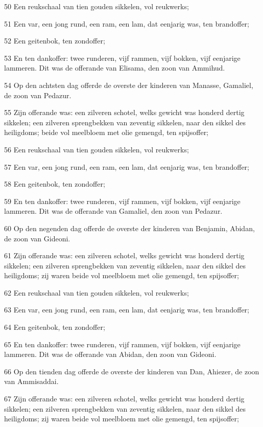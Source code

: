 \par 50 Een reukschaal van tien gouden sikkelen, vol reukwerks;
\par 51 Een var, een jong rund, een ram, een lam, dat eenjarig was, ten brandoffer;
\par 52 Een geitenbok, ten zondoffer;
\par 53 En ten dankoffer: twee runderen, vijf rammen, vijf bokken, vijf eenjarige lammeren. Dit was de offerande van Elisama, den zoon van Ammihud.
\par 54 Op den achtsten dag offerde de overste der kinderen van Manasse, Gamaliel, de zoon van Pedazur.
\par 55 Zijn offerande was: een zilveren schotel, welks gewicht was honderd dertig sikkelen; een zilveren sprengbekken van zeventig sikkelen, naar den sikkel des heiligdoms; beide vol meelbloem met olie gemengd, ten spijsoffer;
\par 56 Een reukschaal van tien gouden sikkelen, vol reukwerks;
\par 57 Een var, een jong rund, een ram, een lam, dat eenjarig was, ten brandoffer;
\par 58 Een geitenbok, ten zondoffer;
\par 59 En ten dankoffer: twee runderen, vijf rammen, vijf bokken, vijf eenjarige lammeren. Dit was de offerande van Gamaliel, den zoon van Pedazur.
\par 60 Op den negenden dag offerde de overste der kinderen van Benjamin, Abidan, de zoon van Gideoni.
\par 61 Zijn offerande was: een zilveren schotel, welks gewicht was honderd dertig sikkelen; een zilveren sprengbekken van zeventig sikkelen, naar den sikkel des heiligdoms; zij waren beide vol meelbloem met olie gemengd, ten spijsoffer;
\par 62 Een reukschaal van tien gouden sikkelen, vol reukwerks;
\par 63 Een var, een jong rund, een ram, een lam, dat eenjarig was, ten brandoffer;
\par 64 Een geitenbok, ten zondoffer;
\par 65 En ten dankoffer: twee runderen, vijf rammen, vijf bokken, vijf eenjarige lammeren. Dit was de offerande van Abidan, den zoon van Gideoni.
\par 66 Op den tienden dag offerde de overste der kinderen van Dan, Ahiezer, de zoon van Ammisaddai.
\par 67 Zijn offerande was: een zilveren schotel, welks gewicht was honderd dertig sikkelen; een zilveren sprengbekken van zeventig sikkelen, naar den sikkel des heiligdoms; zij waren beide vol meelbloem met olie gemengd, ten spijsoffer;
